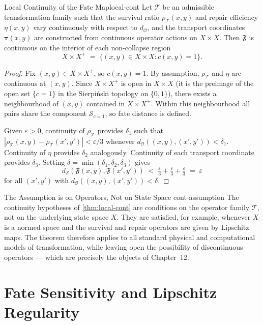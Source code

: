 \documentclass[12pt,twoside,openright]{book}
\newcommand{\transfam}{\mathcal{T}}       %
\newcommand{\distPairs}{X\times X}
\newcommand{\fateMap}{\mathfrak{F}}
\newcommand{\fateSpace}{\mathcal{S}}
\newcommand{\survRatio}{\rho}             %
\newcommand{\repEff}{\eta}               %
\newcommand{\collapseInd}{c}             %
\newcommand{\distMetric}{d_{\mathcal{O}}}
\newcommand{\fateDist}[2]{d_{\fateSpace}(#1,#2)}
\newcommand{\distDist}[2]{d_{\mathcal{O}}(#1,#2)}
\newcommand{\fateComp}[1]{\fateSpace_{\collapseInd=#1}}
\providecommand{\fateComp}[1]{\fateSpace_{\collapseInd=#1}}
\providecommand{\fateDist}[2]{d_{\fateSpace}(#1,#2)}
\providecommand{\distDist}[2]{d_{\mathcal{O}}(#1,#2)}
\begin{document}
\begin{theorem}{Local Continuity of the Fate Map}{local-cont}
Let $\transfam$ be an admissible transformation family such that
the survival ratio $\survRatio_\transfam(x,y)$ and repair
efficiency $\repEff(x,y)$ vary continuously with respect to
$\distMetric$, and the transport coordinates
$\boldsymbol{\tau}(x,y)$ are constructed from continuous operator
actions on $\distPairs$. Then $\fateMap$ is continuous on the
interior of each non-collapse region
\[
  \distPairs^{+}
  \;=\;
  \{(x,y)\in\distPairs : \collapseInd(x,y)=1\}.
\]
\begin{proof}
Fix $(x,y)\in\distPairs^{+}$, so $\collapseInd(x,y)=1$.
By assumption, $\survRatio_\transfam$ and $\repEff$ are continuous
at $(x,y)$. Since $\distPairs^{+}$ is open in $\distPairs$ (it
is the preimage of the open set $\{c=1\}$ in the Sierpi\'{n}ski
topology on $\{0,1\}$), there exists a neighbourhood of $(x,y)$
contained in $\distPairs^{+}$. Within this neighbourhood all
pairs share the component $\fateComp{1}$, so fate distance is
defined.

Given $\varepsilon>0$, continuity of $\survRatio_\transfam$
provides $\delta_1$ such that
$|\survRatio_\transfam(x,y)-\survRatio_\transfam(x',y')|
<\varepsilon/3$
whenever $\distDist{(x,y)}{(x',y')}<\delta_1$.
Continuity of $\repEff$ provides $\delta_2$ analogously.
Continuity of each transport coordinate provides $\delta_3$.
Setting $\delta=\min(\delta_1,\delta_2,\delta_3)$ gives
\[
  \fateDist{\fateMap(x,y)}{\fateMap(x',y')}
  \;<\;
  \tfrac{\varepsilon}{3}+\tfrac{\varepsilon}{3}
  +\tfrac{\varepsilon}{3}
  \;=\;\varepsilon
\]
for all $(x',y')$ with $\distDist{(x,y)}{(x',y')}<\delta$.
\end{proof}
\end{theorem}

\begin{remark}{The Assumption is on Operators, Not on State Space}%
  {cont-assumption}
The continuity hypotheses of \cref{thm:local-cont} are conditions
on the operator family $\transfam$, not on the underlying state
space $X$. They are satisfied, for example, whenever $X$ is a
normed space and the survival and repair operators are given by
Lipschitz maps. The theorem therefore applies to all standard
physical and computational models of transformation, while leaving
open the possibility of discontinuous operators --- which are
precisely the objects of Chapter~12.
\end{remark}

\section{Fate Sensitivity and Lipschitz Regularity}
\end{document}
